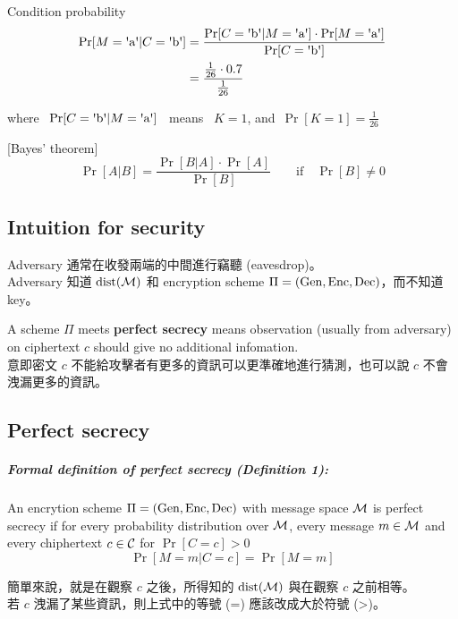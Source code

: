 Condition probability
\begin{align*}
	\Pr[M = \text{\textquotesingle{}a\textquotesingle} | C =  \text{\textquotesingle{}b\textquotesingle}] &=
	\frac{
		\Pr[C = \text{\textquotesingle{}b\textquotesingle} | M = \text{\textquotesingle{}a\textquotesingle}] \cdot \Pr[M = \text{\textquotesingle{}a\textquotesingle}]
	}
	{\Pr[C = \text{\textquotesingle{}b\textquotesingle}]} \\
	&= \frac{\frac{1}{26} \cdot 0.7}{\frac{1}{26}}
\end{align*}

where \, \(\Pr[C = \text{\textquotesingle{}b\textquotesingle} | M = \text{\textquotesingle{}a\textquotesingle}]\) \, means \, \(K = 1\), and\, \(\Pr[K = 1] = \frac{1}{26}\)

[Bayes' theorem]
\[\Pr[A|B] = \frac{\Pr[B|A] \cdot \Pr[A]}{\Pr[B]} \qquad \text{if} \quad \Pr[B] \neq 0\]


\subsection{Intuition for security}

Adversary 通常在收發兩端的中間進行竊聽 (eavesdrop)。 \\
Adversary 知道 \(\operatorname{dist}(\operatorname{\mathcal{M}})\) 和 encryption scheme \(\Pi = (\operatorname{Gen}, \operatorname{Enc}, \operatorname{Dec})\)，而不知道 key。

A scheme \(\Pi\) meets \textbf{perfect secrecy} means observation (usually from adversary) on ciphertext \(c\) should give no additional infomation. \\
意即密文 \(c\) 不能給攻擊者有更多的資訊可以更準確地進行猜測，也可以說 \(c\) 不會洩漏更多的資訊。


\subsection{Perfect secrecy}

\subparagraph{Formal definition of perfect secrecy (\textbf{Definition 1}):}

An encrytion scheme \(\Pi = (\operatorname{Gen}, \operatorname{Enc}, \operatorname{Dec})\) with message space \(\operatorname{\mathcal{M}}\) is perfect secrecy if for every probability distribution over \(\operatorname{\mathcal{M}}\), every message \(m \in \operatorname{\mathcal{M}}\) and every chiphertext \(c \in \operatorname{\mathcal{C}}\) for \(\Pr[C = c] > 0\)
\[\Pr[M = m | C = c] = \Pr[M = m]\]

簡單來說，就是在觀察 \(c\) 之後，所得知的 \(\operatorname{dist}(\operatorname{\mathcal{M}})\) 與在觀察 \(c\) 之前相等。 \\
若 \(c\) 洩漏了某些資訊，則上式中的等號 (=) 應該改成大於符號 (>)。


